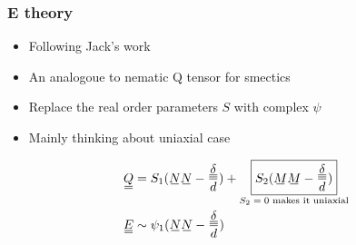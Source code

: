 \documentclass[10pt]{beamer}
\begin{document}
\begin{frame}
\frametitle{E theory}
\begin{itemize}
    \item Following Jack's work
    \item An analogoue to nematic Q tensor for smectics
    \item Replace the real order parameters $S$ with complex $\psi$
    \item Mainly thinking about uniaxial case
\end{itemize}
\begin{align*}
    \du{Q} &= S_1(\su{N}\su{N} - \frac{\du{\delta}}{d}) + \underset{\text{$S_2=0$ makes it uniaxial}}{\boxed{S_2(\su{M}\su{M} - \frac{\du{\delta}}{d})}} \\
    \du{E} &\sim \psi_1(\su{N}\su{N} - \frac{\du{\delta}}{d})
\end{align*}
\end{frame}
\end{document}
